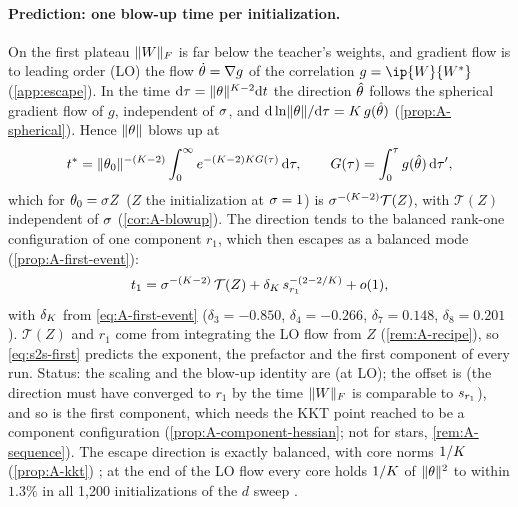 \paragraph{Prediction: one blow-up time per initialization.}
On the first plateau $\lVert W\rVert_{F}$ is far below the teacher's weights, and gradient flow is to leading order (LO)
the flow $\dot{\theta}=\nabla g$ of the correlation $g=\ip{\W}{\Wt}$ (\cref{app:escape}). In the time
$\mathrm{d}\tau=\lVert\theta\rVert^{K-2}\mathrm{d} t$ the direction $\hat{\theta}$ follows the spherical gradient flow of $g$,
independent of $\sigma$, and $\mathrm{d}\ln\lVert\theta\rVert/\mathrm{d}\tau=K\,g(\hat{\theta})$ (\cref{prop:A-spherical}). Hence
$\lVert\theta\rVert$ blows up at
\[
  t^*=\lVert\theta_0\rVert^{-(K-2)}\int_0^\infty e^{-(K-2)K G(\tau)}\,\mathrm{d}\tau,\qquad
  G(\tau)=\int_0^\tau g(\hat{\theta})\,\mathrm{d}\tau',
\]
which for $\theta_0=\sigma Z$ ($Z$ the initialization at $\sigma=1$) is $\sigma^{-(K-2)}\mathcal{T}(Z)$, with $\mathcal{T}(Z)$
independent of $\sigma$ (\cref{cor:A-blowup}). The direction tends to the balanced rank-one configuration of one
component $r_1$, which then escapes as a balanced mode (\cref{prop:A-first-event}):
\begin{equation}\label{eq:s2s-first}
  t_{1}=\sigma^{-(K-2)}\,\mathcal{T}(Z)+\delta_K\,s_{r_1}^{-(2-2/K)}+o(1),
\end{equation}
with $\delta_K$ from \eqref{eq:A-first-event} ($\delta_3=-0.850$, $\delta_4=-0.266$, $\delta_7=0.148$,
$\delta_8=0.201$). $\mathcal{T}(Z)$ and $r_1$ come from integrating the LO flow from $Z$ (\cref{rem:A-recipe}), so
\eqref{eq:s2s-first} predicts the exponent, the prefactor and the first component of every run. Status: the
scaling and the blow-up identity are \proven{} (at LO); the offset is \derived{} (the direction must have
converged to $r_1$ by the time $\lVert W\rVert_{F}$ is comparable to $s_{r_1}$), and so is the first component, which
needs the KKT point reached to be a component configuration (\cref{prop:A-component-hessian}; not for stars,
\cref{rem:A-sequence}). The escape direction is exactly balanced, with core norms
$1/K$ (\cref{prop:A-kkt}) \proven; at the end of the LO flow every core holds $1/K$ of $\lVert\theta\rVert^2$ to
within $1.3\%$ in all 1,200 initializations of the $d$ sweep \empirical.  

